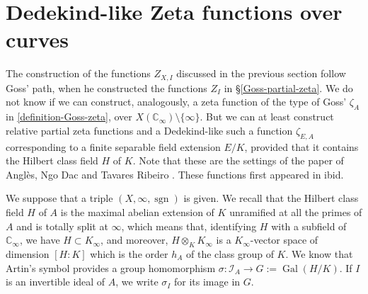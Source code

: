\documentclass[11pt]{amsart}
\numberwithin{equation}{section}
\newcommand{\CC}{\mathbb{C}}
\newcommand{\sgn}{\operatorname{sgn}}
\begin{document}
\section{Dedekind-like Zeta functions over curves}\label{Dedekind}

The construction of the functions $Z_{X,I}$ discussed in the previous section follow Goss' path, when he constructed the functions $Z_I$ in \S \ref{Goss-partial-zeta}.
We do not know if we can construct, analogously, a zeta function of the type of Goss' $\zeta_A$ in \eqref{definition-Goss-zeta}, over $X(\CC_\infty)\setminus\{\infty\}$. But we can at least construct relative partial zeta functions and a Dedekind-like such a function $\zeta_{E,A}$ corresponding to a finite separable field extension $E/K$, provided that it contains the Hilbert class field $H$ of $K$. Note that these are the settings of the paper of Angl\`es, Ngo Dac and Tavares Ribeiro \cite{ANG&NGO&TAV}. These functions first appeared in ibid. 

We suppose that a triple $(X,\infty,\sgn)$ is given. 
We recall that the Hilbert class field $H$ of $A$ is the maximal abelian extension of $K$ unramified at all the primes of $A$ and is totally split at $\infty$, which means that, identifying $H$ with a subfield of $\CC_\infty$, we have $H\subset K_\infty$, and moreover, $H\otimes_{K}K_\infty$ is a $K_\infty$-vector space of dimension $[H:K]$ which is the order $h_A$ of the class group of $K$. We know that Artin's symbol provides 
a group homomorphism $\sigma:\mathcal{I}_A\rightarrow G:=\operatorname{Gal}(H/K)$. If $I$ is an invertible ideal of $A$, we write $\sigma_I$ for its image in $G$. 
 
\end{document}
